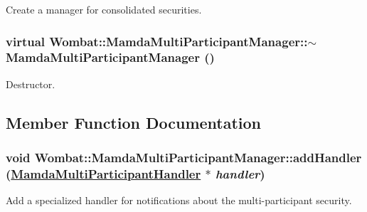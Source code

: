 Create a manager for consolidated securities. 

\hypertarget{classWombat_1_1MamdaMultiParticipantManager_8fe05673332e0d57f0a77cc45fe32866}{
\subsubsection[$\sim$MamdaMultiParticipantManager]{\setlength{\rightskip}{0pt plus 5cm}virtual Wombat::Mamda\-Multi\-Participant\-Manager::$\sim$Mamda\-Multi\-Participant\-Manager ()}}
\label{classWombat_1_1MamdaMultiParticipantManager_8fe05673332e0d57f0a77cc45fe32866}


Destructor. 



\subsection{Member Function Documentation}
\hypertarget{classWombat_1_1MamdaMultiParticipantManager_15c57fa29aab488747d1febedba15111}{
\subsubsection[addHandler]{\setlength{\rightskip}{0pt plus 5cm}void Wombat::Mamda\-Multi\-Participant\-Manager::add\-Handler (\hyperlink{classWombat_1_1MamdaMultiParticipantHandler}{Mamda\-Multi\-Participant\-Handler} $\ast$ {\em handler})}}
\label{classWombat_1_1MamdaMultiParticipantManager_15c57fa29aab488747d1febedba15111}


Add a specialized handler for notifications about the multi-participant security. 

